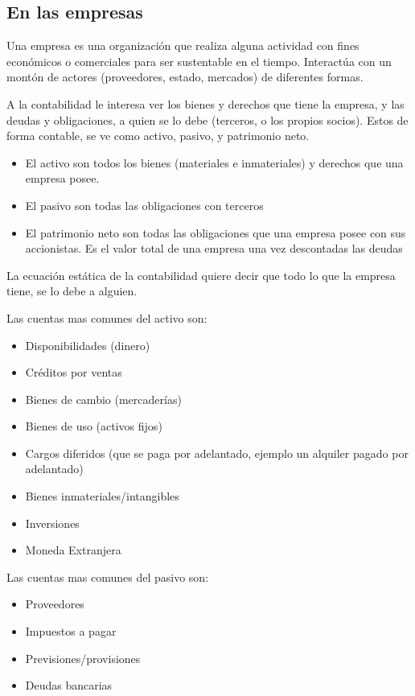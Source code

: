 \documentclass[titlepage,a4paper]{article}
\begin{document}
\subsection*{En las empresas}
Una empresa es una organización que realiza alguna actividad con fines económicos o comerciales para ser sustentable en el tiempo. Interactúa con un montón de actores (proveedores, estado, mercados) de diferentes formas.

A la contabilidad le interesa ver los bienes y derechos que tiene la empresa, y las deudas y obligaciones, a quien se lo debe (terceros, o los propios socios). Estos de forma contable, se ve como activo, pasivo, y patrimonio neto.

\begin{itemize}
\item El activo son todos los bienes (materiales e inmateriales) y derechos que una empresa posee.
\item El pasivo son todas las obligaciones con terceros
\item El patrimonio neto son todas las obligaciones que una empresa posee con sus accionistas. Es el valor total de una empresa una vez descontadas las deudas
\end{itemize}

La ecuación estática de la contabilidad quiere decir que todo lo que la empresa tiene, se lo debe a alguien.

Las cuentas mas comunes del activo son:
\begin{itemize}
\item Disponibilidades (dinero)
\item Créditos por ventas
\item Bienes de cambio (mercaderías)
\item Bienes de uso (activos fijos)
\item Cargos diferidos (que se paga por adelantado, ejemplo un alquiler pagado por adelantado)
\item Bienes inmateriales/intangibles
\item Inversiones
\item Moneda Extranjera
\end{itemize}

Las cuentas mas comunes del pasivo son:
\begin{itemize}
\item Proveedores
\item Impuestos a pagar
\item Previsiones/provisiones
\item Deudas bancarias
\end{itemize}
\end{document}
